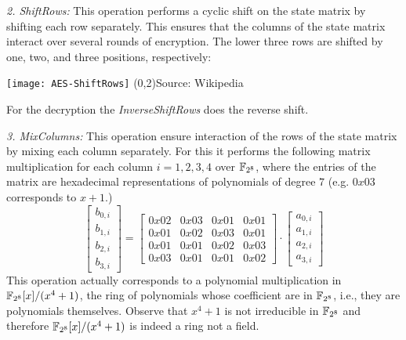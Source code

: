 \textit{2. ShiftRows:} This operation performs a cyclic shift on the state
matrix by shifting each row separately.  This ensures that the columns of the
state matrix interact over several rounds of encryption. The lower three rows
are shifted by one, two, and three positions, respectively:   
\begin{center}
  \texttt{[image: AES-ShiftRows]}
  (0,2){\tiny Source: Wikipedia}%
\end{center}
  For the decryption the \textit{InverseShiftRows}
does the reverse shift.%

\textit{3. MixColumns:}     This operation
ensure interaction of the rows of the state matrix by mixing each column
separately. For this it performs the following matrix multiplication for each
column $i=1,2,3,4$ over ${ \mathbb{F}_{2^8}}$, where the entries of the matrix are
hexadecimal representations of polynomials of degree $7$ (e.g. $0x03$ corresponds
to $x+1$.)
\[\begin{bmatrix}b_{0,i}\\b_{1,i}\\b_{2,i}\\b_{3,i}\end{bmatrix}=
\begin{bmatrix} 0x02&0x03&0x01&0x01 \\ 0x01&0x02&0x03&0x01 \\ 
  0x01&0x01&0x02&0x03 \\ 0x03&0x01&0x01&0x02 \end{bmatrix}\cdot
\begin{bmatrix}a_{0,i}\\a_{1,i}\\a_{2,i}\\a_{3,i}\end{bmatrix}\] This operation
actually corresponds to a polynomial multiplication in ${ \mathbb{F}_{2^8}}[x]/(x^4+1)$,
the ring of polynomials whose coefficient are in ${ \mathbb{F}_{2^8}}$, i.e., they are
polynomials themselves. Observe that $x^4+1$ is not irreducible in ${ \mathbb{F}_{2^8}}$
and therefore ${ \mathbb{F}_{2^8}}[x]/(x^4+1)$ is indeed a ring not a field.

